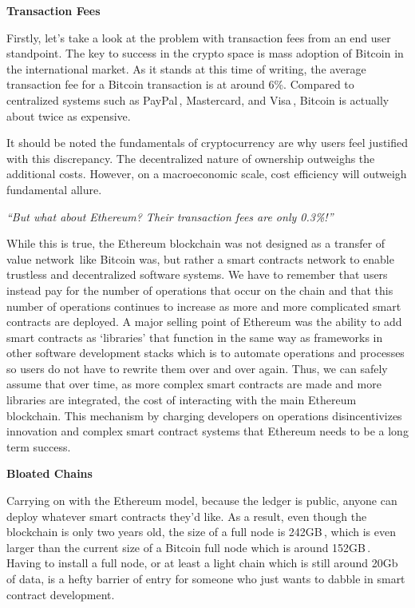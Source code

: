 \documentclass{%
	article}
\begin{document}
\begin{center}
\textbf{Transaction Fees}
\end{center}

Firstly, let’s take a look at the problem with transaction fees from an end user standpoint. The key to success in the crypto space is mass adoption of Bitcoin in the international market. As it stands at this time of writing, the average transaction fee for a Bitcoin transaction is at around 6\%. Compared to centralized systems such as PayPal\,\cite{paypalfees}, Mastercard, and Visa\,\cite{ccfees}, Bitcoin is actually about twice as expensive.

It should be noted the fundamentals of cryptocurrency are why users feel justified with this discrepancy. The decentralized nature of ownership outweighs the additional costs. However, on a macroeconomic scale, cost efficiency will outweigh fundamental allure.

\begin{center}
\textit{“But what about Ethereum? Their transaction fees are only 0.3\%!”}
\end{center}
	
While this is true, the Ethereum blockchain was not designed as a transfer of value network\,\cite{ethereumwp} like Bitcoin was, but rather a smart contracts network to enable trustless and decentralized software systems. We have to remember that users instead pay for the number of operations that occur on the chain and that this number of operations continues to increase as more and more complicated smart contracts are deployed. A major selling point of Ethereum was the ability to add smart contracts as ‘libraries’ that function in the same way as frameworks in other software development stacks which is to automate operations and processes so users do not have to rewrite them over and over again. Thus, we can safely assume that over time, as more complex smart contracts are made and more libraries are integrated, the cost of interacting with the main Ethereum blockchain. This mechanism by charging developers on operations disincentivizes innovation and complex smart contract systems that Ethereum needs to be a long term success.

\begin{center}
\textbf{Bloated Chains}
\end{center}

Carrying on with the Ethereum model, because the ledger is public, anyone can deploy whatever smart contracts they’d like. As a result, even though the blockchain is only two years old, the size of a full node is 242GB\,\cite{ethchainsize}, which is even larger than the current size of a Bitcoin full node which is around 152GB\,\cite{btcchainsize}. Having to install a full node, or at least a light chain which is still around 20Gb of data, is a hefty barrier of entry for someone who just wants to dabble in smart contract development.
\end{document}
